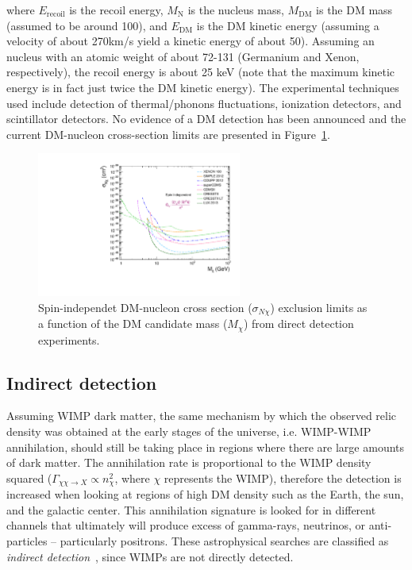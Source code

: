 where $E_{\mathrm{recoil}}$ is the recoil energy, $M_{\mathrm{N}}$ is
the nucleus mass, $M_{\mathrm{DM}}$ is the DM mass (assumed to be
around 100\GeV), and $E_{\mathrm{DM}}$ is the DM kinetic energy
(assuming a velocity of about 270\unit{km/s} yield a kinetic energy of
about 50\keV). Assuming an nucleus with an atomic weight of about
72-131 (Germanium and Xenon, respectively), the recoil energy is about
25 keV (note that the maximum kinetic energy is in fact just twice the
DM kinetic energy). The experimental techniques used include detection
of thermal/phonons fluctuations, ionization detectors, and scintillator
detectors. No evidence of a DM detection has been announced and
the current DM-nucleon cross-section limits are presented in
Figure~\ref{fig:dmLimits}. 
\begin{figure}
 \centering
\includegraphics[width=0.6\textwidth]{IntroFigures/SI_DM.pdf}
\caption{Spin-independet DM-nucleon cross section ($\sigma_{N\chi}$) exclusion limits
  as a function of the DM candidate mass ($M_{\chi}$) from direct detection experiments.\label{fig:dmLimits}}
\end{figure}
\subsection{Indirect detection}
Assuming WIMP dark matter, the same mechanism by which the observed
relic density was obtained at the early stages of the universe,
i.e. WIMP-WIMP annihilation, should still be taking place in regions
where there are large amounts of dark matter. The annihilation
rate is proportional to the  WIMP density squared
($\Gamma_{\chi\chi\rightarrow X} \propto n^{2}_{\chi}$, where $\chi$
represents the WIMP), therefore the detection is increased when
looking at regions of high DM density such as the Earth, the sun, and
the galactic center. This annihilation signature is looked for in
different channels that ultimately will produce excess of gamma-rays,
neutrinos, or anti-particles -- particularly positrons. These
astrophysical searches are classified as \textit{indirect
  detection}~\cite{IND1,IND2}, since WIMPs are not directly detected. 

